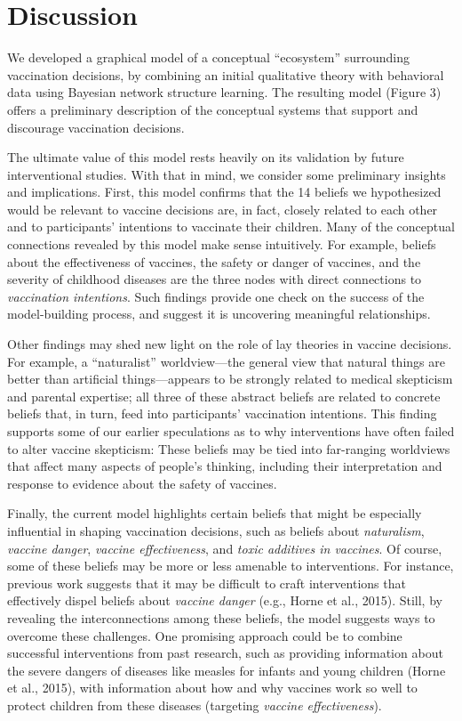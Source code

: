 \documentclass[10pt, letterpaper]{article}
\begin{document}
\section{Discussion}\label{discussion}

We developed a graphical model of a conceptual ``ecosystem'' surrounding
vaccination decisions, by combining an initial qualitative theory with
behavioral data using Bayesian network structure learning. The resulting
model (Figure 3) offers a preliminary description of the conceptual
systems that support and discourage vaccination decisions.

The ultimate value of this model rests heavily on its validation by
future interventional studies. With that in mind, we consider some
preliminary insights and implications. First, this model confirms that
the 14 beliefs we hypothesized would be relevant to vaccine decisions
are, in fact, closely related to each other and to participants'
intentions to vaccinate their children. Many of the conceptual
connections revealed by this model make sense intuitively. For example,
beliefs about the effectiveness of vaccines, the safety or danger of
vaccines, and the severity of childhood diseases are the three nodes
with direct connections to \emph{vaccination intentions}. Such findings
provide one check on the success of the model-building process, and
suggest it is uncovering meaningful relationships.

Other findings may shed new light on the role of lay theories in vaccine
decisions. For example, a ``naturalist'' worldview---the general view
that natural things are better than artificial things---appears to be
strongly related to medical skepticism and parental expertise; all three
of these abstract beliefs are related to concrete beliefs that, in turn,
feed into participants' vaccination intentions. This finding supports
some of our earlier speculations as to why interventions have often
failed to alter vaccine skepticism: These beliefs may be tied into
far-ranging worldviews that affect many aspects of people's thinking,
including their interpretation and response to evidence about the safety
of vaccines.

Finally, the current model highlights certain beliefs that might be
especially influential in shaping vaccination decisions, such as beliefs
about \emph{naturalism}, \emph{vaccine danger}, \emph{vaccine
effectiveness}, and \emph{toxic additives in vaccines}. Of course, some
of these beliefs may be more or less amenable to interventions. For
instance, previous work suggests that it may be difficult to craft
interventions that effectively dispel beliefs about \emph{vaccine
danger} (e.g., Horne et al., 2015). Still, by revealing the
interconnections among these beliefs, the model suggests ways to
overcome these challenges. One promising approach could be to combine
successful interventions from past research, such as providing
information about the severe dangers of diseases like measles for
infants and young children (Horne et al., 2015), with information about
how and why vaccines work so well to protect children from these
diseases (targeting \emph{vaccine effectiveness}).
\end{document}
